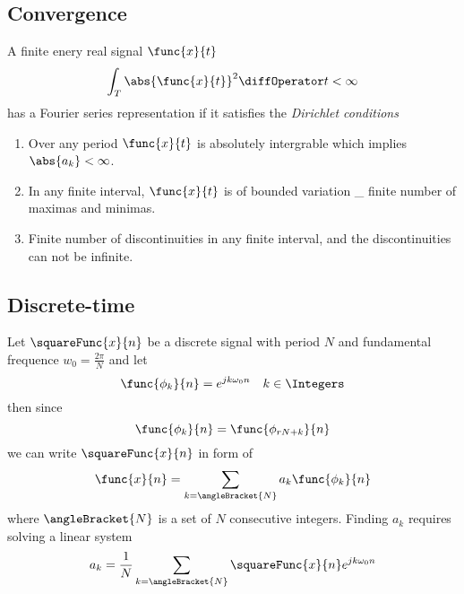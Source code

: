 \subsection{Convergence}
A finite enery real signal \(\func{x}{t}\)
\begin{equation*}
    \int_{T} \abs{\func{x}{t}}^2 \diffOperator t < \infty
\end{equation*}
has a Fourier series representation if it satisfies the \textit{Dirichlet conditions}
\begin{enumerate}
    \item Over any period \(\func{x}{t}\) is absolutely intergrable which implies \(\abs{a_k} < \infty\).
    \item In any finite interval, \(\func{x}{t}\) is of bounded variation \_ finite number of maximas and minimas.
    \item Finite number of discontinuities in any finite interval, and the discontinuities can not be infinite.
\end{enumerate}

\subsection{Discrete-time}
Let \(\squareFunc{x}{n}\) be a discrete signal with period \(N\) and fundamental frequence \(w_0 = \frac{2\pi}{N}\) and let  
\begin{equation*}
    \func{\phi_k}{n} = e^{jk\omega_0 n} \quad k \in \Integers
\end{equation*}
then since 
\begin{equation*}
    \func{\phi_k}{n} = \func{\phi_{rN + k}}{n}
\end{equation*}
we can write \(\squareFunc{x}{n}\) in form of 
\begin{equation*}
    \func{x}{n} = \sum_{k = \angleBracket{N}} a_k \func{\phi_k}{n}
\end{equation*}
where \(\angleBracket{N}\) is a set of \(N\) consecutive integers. Finding \(a_k\) requires solving a linear system 
\begin{equation*}
    a_k = \dfrac{1}{N} \sum_{k = \angleBracket{N}} \squareFunc{x}{n} e^{jk \omega_0 n}
\end{equation*}

